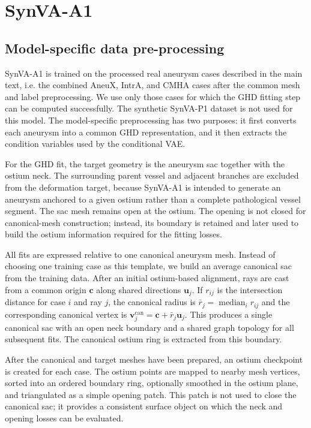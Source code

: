 % 

\section{SynVA-A1}
\label{Appendix:SynVA-A1}

\subsection{Model-specific data pre-processing}

SynVA-A1 is trained on the processed real aneurysm cases described in the main
text, i.e. the combined AneuX, IntrA, and CMHA cases after the common mesh and
label preprocessing. We use only those cases for which the GHD fitting step can
be computed successfully. The synthetic SynVA-P1 dataset is not used for this
model. The model-specific preprocessing has two purposes: it first converts
each aneurysm into a common GHD representation, and it then extracts the
condition variables used by the conditional VAE.

For the GHD fit, the target geometry is the aneurysm sac together with the
ostium neck. The surrounding parent vessel and adjacent branches are excluded
from the deformation target, because SynVA-A1 is intended to generate an
aneurysm anchored to a given ostium rather than a complete pathological vessel
segment. The sac mesh remains open at the ostium. The opening is not closed
for canonical-mesh construction; instead, its boundary is retained and later
used to build the ostium information required for the fitting losses.

All fits are expressed relative to one canonical aneurysm mesh. Instead of
choosing one training case as this template, we build an average canonical sac
from the training data. After an initial ostium-based alignment, rays are cast
from a common origin $\bm{c}$ along shared directions $\bm{u}_j$. If $r_{ij}$
is the intersection distance for case $i$ and ray $j$, the canonical radius is
$\bar{r}_j=\operatorname*{median}_{i} r_{ij}$ and the corresponding canonical
vertex is $\bm{v}^{\mathrm{can}}_j=\bm{c}+\bar{r}_j\bm{u}_j$. This produces a
single canonical sac with an open neck boundary and a shared graph topology for
all subsequent fits. The canonical ostium ring is extracted from this boundary.

After the canonical and target meshes have been prepared, an ostium checkpoint
is created for each case. The ostium points are mapped to nearby mesh
vertices, sorted into an ordered boundary ring, optionally smoothed in the
ostium plane, and triangulated as a simple opening patch. This patch is not
used to close the canonical sac; it provides a consistent surface object on
which the neck and opening losses can be evaluated.

